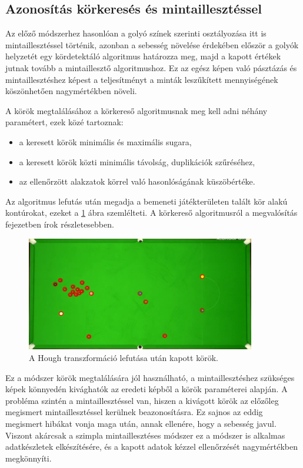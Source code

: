 \subsection{Azonosítás körkeresés és mintaillesztéssel}
Az előző módszerhez hasonlóan a golyó színek szerinti osztályozása itt is mintaillesztéssel történik, azonban a sebesség növelése érdekében először a golyók helyzetét egy kördetektáló algoritmus határozza meg, majd a kapott értékek jutnak tovább a mintaillesztő algoritmushoz. Ez az egész képen való pásztázás és mintaillesztéshez képest a teljesítményt a minták leszűkített mennyiségének köszönhetően nagymértékben növeli.

\par A körök megtalálásához a körkereső algoritmusnak meg kell adni néhány paramétert, ezek közé tartoznak:
\begin{itemize}
    \setlength\itemsep{-2pt}
    \item a keresett körök minimális és maximális sugara,
    \item a keresett körök közti minimális távolság, duplikációk szűréséhez,
    \item az ellenőrzött alakzatok körrel való hasonlóságának küszöbértéke.
\end{itemize}
\par Az algoritmus lefutás után megadja a bemeneti játékterületen talált kör alakú kontúrokat, ezeket a \ref{fig:talalt_korok} ábra szemlélteti. A körkereső algoritmusról a megvalósítás fejezetben írok részletesebben.

\begin{figure}[!ht]
    \centering
    \includegraphics[width=100mm, keepaspectratio]{figures/detected_circles.png}
    \caption{A Hough transzformáció lefutása után kapott körök.}
    \label{fig:talalt_korok}
\end{figure}

\par Ez a módszer körök megtalálására jól használható, a mintaillesztéshez szükséges képek könnyedén kivághatók az eredeti képből a körök paraméterei alapján. A probléma szintén a mintaillesztéssel van, hiszen a kivágott körök az előzőleg megismert mintaillesztéssel kerülnek beazonosításra. Ez sajnos az eddig megismert hibákat vonja maga után, annak ellenére, hogy a sebesség javul. Viszont akárcsak a szimpla mintaillesztéses módszer ez a módszer is alkalmas adatkészletek elkészítésére, és a kapott adatok kézzel ellenőrzését nagymértékben megkönnyíti.


